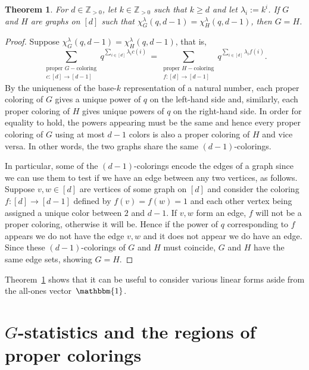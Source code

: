 \documentclass[11pt]{amsart}
\newtheorem{theorem}{Theorem}  [section] \numberwithin{equation}{section}
\begin{document}
\begin{theorem}\label{thm:distinguishedlabeled}
    For $d \in \mathbb{Z}_{>0}$, let $k \in \mathbb{Z}_{>0}$ such that $k \geq d$ and let $\lambda_i := k^i$. 
    If $G$ and $H$ are graphs on $[d]$ such that $\chi^\lambda_G(q,d-1) = \chi^\lambda_H(q,d-1)$, then $G=H$.
\end{theorem}
\begin{proof}
    Suppose $\chi^\lambda_G(q,d-1) = \chi^\lambda_H(q,d-1)$, that is,
    \[
        \sum_{\substack{\text{proper } G-\text{coloring} \\ c:[d] \to [d-1]}} q^{\sum_{i \in [d]} \lambda_i
c(i)} \, = \sum_{\substack{\text{proper } H-\text{coloring} \\ f:[d] \to [d-1]}} q^{\sum_{i \in [d]} \lambda_i f(i)}.
    \]
By the uniqueness of the base-$k$ representation of a natural number, each proper coloring of $G$ gives a unique
power of $q$ on the left-hand side and, similarly, each proper coloring of $H$ gives unique powers of $q$ on the right-hand side. 
    In order for equality to hold, the powers appearing must be the same and hence every proper coloring of $G$ using at most $d-1$ colors is also a proper coloring of $H$ and vice versa. 
    In other words, the two graphs share the same $(d-1)$-colorings.
    
    In particular, some of the $(d-1)$-colorings encode the edges of a graph since we can use them to test if we
have an edge between any two vertices, as follows.
    Suppose $v,w \in [d]$ are vertices of some graph on $[d]$ and consider the coloring $f: [d] \to [d-1]$
defined by $f(v) = f(w)=1$ and each other vertex being assigned a unique color between $2$ and $d-1$.
    If $v,w$ form an edge, $f$ will not be a proper coloring, otherwise it will be.
    Hence if the power of $q$ corresponding to $f$ appears we do not have the edge $v,w$ and it does not appear we do have an edge.
    Since these $(d-1)$-colorings of $G$ and $H$ must coincide, $G$ and $H$ have the same edge sets, showing $G=H$.
\end{proof}

Theorem~\ref{thm:distinguishedlabeled} shows that it can be useful to consider various linear forms aside from the all-ones vector~$\mathbbm{1}$.



\section{$G$-statistics and the regions of proper colorings}\label{sec:gstats}
\end{document}
